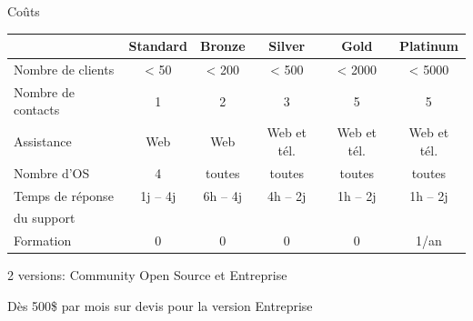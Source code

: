\documentclass[aspectratio=169]{beamer}
\begin{document}
\begin{frame}{Coûts}
\begin{center}

 \begin{tabular}{|l|ccccc|}
    \hline
    & Standard & Bronze & Silver & Gold & Platinum \\
    \hline
    \hline
    Nombre de clients & < 50 & < 200 & < 500 & < 2000 & < 5000 \\
    \hline
    Nombre de contacts & 1 & 2 & 3 & 5 & 5 \\
    \hline
    Assistance & Web & Web & Web et tél.& Web et tél. & Web et tél. \\
    \hline
    Nombre d'OS & 4 & toutes & toutes & toutes & toutes \\
    \hline
    Temps de réponse & 1j -- 4j & 6h -- 4j & 4h -- 2j & 1h -- 2j & 1h -- 2j \\ %
    du support &  & & & & \\
    \hline
    Formation & 0 & 0 & 0 & 0 & 1/an \\
    \hline
 \end{tabular}
\end{center}

2 versions: Community Open Source et Entreprise

Dès 500\$ par mois sur devis pour la version Entreprise
\end{frame}
\end{document}
